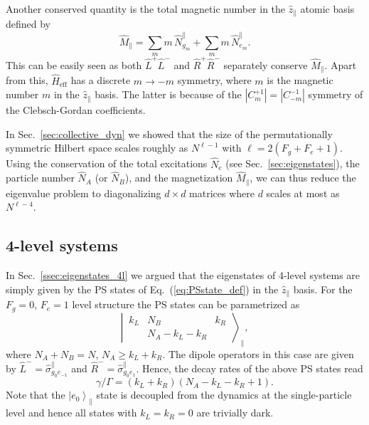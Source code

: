 \documentclass[aps,prx,superscriptaddress,twocolumn,notitlepage,nofootinbib,longbibliography]{revtex4-2}
\newcommand{\ket}[1]{\left|#1\right>}
\newcommand{\quv}{\hat{z}}
\begin{document}
Another conserved quantity is the total magnetic number in the $\quv_\parallel$ atomic basis defined by
\begin{equation}
    \hat{M}_\parallel = \sum_m m\, \hat{N}^\parallel_{g_m} + \sum_m m\, \hat{N}^\parallel_{e_m}.
\end{equation}
This can be easily seen as both $\hat{L}^+\hat{L}^-$ and $\hat{R}^+\hat{R}^-$ separately conserve $\hat{M}_\parallel$. Apart from this, $\hat{H}_\text{eff}$ has a discrete $m\rightarrow -m$ symmetry, where $m$ is the magnetic number $m$ in the $\quv_\parallel$ basis. The latter is because of the $|C^{+1}_{m}|=|C^{-1}_{-m}|$ symmetry of the Clebsch-Gordan coefficients.

In Sec.~\ref{sec:collective_dyn} we showed that the size of the permutationally symmetric Hilbert space scales roughly as $N^{\ell-1}$ with $\ell=2(F_g+F_e+1)$. Using the conservation of the total excitations $\hat{N}_e$ (see Sec.~\ref{sec:eigenstates}), the particle number $\hat{N}_A$ (or $\hat{N}_B$), and the magnetization $\hat{M}_\parallel$, we can thus reduce the eigenvalue problem to diagonalizing $d\times d$ matrices where $d$ scales at most as $N^{\ell-4}$.





\subsection{4-level systems}

In Sec.~\ref{ssec:eigenstates_4l} we argued that the eigenstates of 4-level systems are simply given by the PS states of Eq.~(\ref{eq:PSstate_def}) in the $\quv_\parallel$ basis.
For the $F_g=0$, $F_e=1$ level structure the PS states can be parametrized as
\begin{equation}
	\left|\, \begin{matrix} k_L & N_B & k_R \\  & N_A-k_L-k_R & \end{matrix} \,\right\rangle_\parallel ,
\end{equation}
where $N_A+N_B=N$, $N_A\geq k_L+k_R$. The dipole operators in this case are given by $\hat{L}^-=\hat{\sigma}^\parallel_{g_0e_{-1}}$ and $\hat{R}^-=\hat{\sigma}^\parallel_{g_0e_{1}}$. Hence, the decay rates of the above PS states read
\begin{equation}
    \gamma/\Gamma = (k_L+k_R)(N_A-k_L-k_R+1).
\label{eq:gamma_4l_V}
\end{equation}
Note that the $\ket{e_0}_\parallel$ state is decoupled from the dynamics at the single-particle level and hence all states with $k_L=k_R=0$ are trivially dark.
\end{document}
